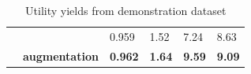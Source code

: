 \documentclass[\ifafour a4paper,12pt,\else a5paper,10pt,\fi%
onecolumn,oneside,article,%
british%
]{memoir}
\theoremstyle{remark}
\theoremstyle{innote}
\renewcommand*{\|}[1][]{\nonscript\:#1\vert\nonscript\:\mathopen{}}
\begin{document}
\begin{table}[!p]
\begin{tabular*}{\linewidth}{clw{c}{0.12\linewidth}w{c}{0.12\linewidth}w{c}{0.12\linewidth}w{c}{0.12\linewidth}}
 &\parbox{0.21\linewidth}{\color{myred}}
 &\textcolor{myred}{0.959}
 &\textcolor{myred}{1.52}
 &\textcolor{myred}{7.24}
 &\textcolor{myred}{8.63}
 \\[1\jot]
 &\parbox{0.21\linewidth}{\color{mypurpleblue}\bfseries augmentation}
 &\textcolor{mypurpleblue}{\bfseries 0.962}
 &\textcolor{mypurpleblue}{\bfseries 1.64}
 &\textcolor{mypurpleblue}{\bfseries 9.59}
 &\textcolor{mypurpleblue}{\bfseries 9.09}
  \end{tabular*}
  \\[1em]
  \caption{Utility yields from demonstration dataset}
  \label{tab:results_utilities}



\vspace{3em}
  

\end{table}
\end{document}
